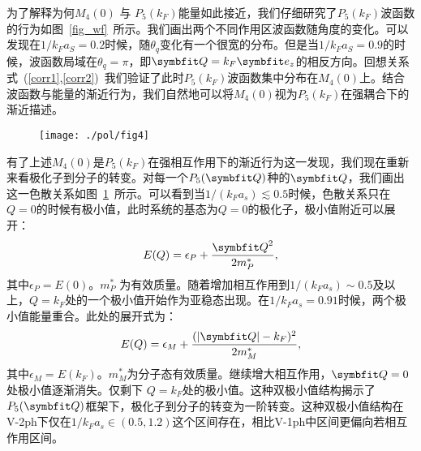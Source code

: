 为了解释为何$M_4(0)$ 与 $P_5(k_F)$能量如此接近，我们仔细研究了$P_5(k_F)$波函数的行为如图~\ref{fig_wf}~所示。我们画出两个不同作用区波函数随角度的变化。可以发现在$1/k_Fa_S=0.2$时候，随$\theta_q$变化有一个很宽的分布。但是当$1/k_Fa_S=0.9$的时候，波函数局域在$\theta_q=\pi$，即$\Vector{Q}=k_F\Vector{e}_z$的相反方向。回想关系式~(\ref{corr1},\ref{corr2})~我们验证了此时$P_5(k_F)$波函数集中分布在$M_4(0)$上。结合波函数与能量的渐近行为，我们自然地可以将$M_4(0)$视为$P_5(k_F)$在强耦合下的渐近描述。

\begin{figure}[h]
\centering
\texttt{[image: ./pol/fig4]}
\label{fig_transition_3D}
\end{figure}

有了上述$M_4(0)$是$P_5(k_F)$在强相互作用下的渐近行为这一发现，我们现在重新来看极化子到分子的转变。对每一个$P_5(\Vector{Q})$种的$\Vector{Q}$，我们画出这一色散关系如图~\ref{fig_transition_3D}~所示。可以看到当$1/(k_Fa_s)\lesssim 0.5$时候，色散关系只在$Q=0$的时候有极小值，此时系统的基态为$Q=0$的极化子，极小值附近可以展开：
\begin{equation}
E(Q)=\epsilon_P+\frac{{\Vector{Q} }^2}{2m_P^{*}},
\end{equation}
其中$\epsilon_P=E(0)$。$m_P^{*}$ 为有效质量。随着增加相互作用到$1/(k_Fa_s)\sim 0.5$及以上，$Q=k_F$处的一个极小值开始作为亚稳态出现。在$1/k_Fa_s=0.91$时候，两个极小值能量重合。此处的展开式为：
\begin{equation}
E(Q)=\epsilon_M+\frac{(|{\Vector{Q} }|-k_F)^2}{2m_M^{*}}, \label{E_M}
\end{equation}
其中$\epsilon_M=E(k_F)$。$m_M^{*}$为分子态有效质量。继续增大相互作用，$\Vector{Q}=0$处极小值逐渐消失。仅剩下
$Q=k_F$处的极小值。这种双极小值结构揭示了$P_5(\Vector{Q})$框架下，极化子到分子的转变为一阶转变。这种双极小值结构在V-2ph下仅在$1/k_Fa_s\in (0.5,1.2)$这个区间存在，相比V-1ph中区间更偏向若相互作用区间\cite{Cui2020Fermi}。


